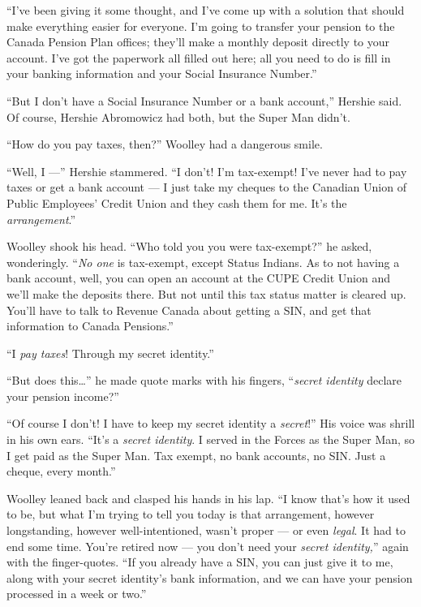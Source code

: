 ``I've been giving it some thought, and I've come up with a solution that 
should make everything easier for everyone. I'm going to transfer your pension 
to the Canada Pension Plan offices; they'll make a monthly deposit directly to 
your account. I've got the paperwork all filled out here; all you need to do is 
fill in your banking information and your Social Insurance Number.''

``But I don't have a Social Insurance Number or a bank account,''
Hershie said. Of course, Hershie Abromowicz had both, but the Super
Man didn't.

``How do you pay taxes, then?'' Woolley had a dangerous smile.

``Well, I ---'' Hershie stammered.
``I don't! I'm tax-exempt! I've never had to pay taxes or get a bank account 
--- I just take my cheques to the Canadian Union of Public Employees' Credit 
Union and they cash them for me. It's the \emph{arrangement}.''

Woolley shook his head. ``Who told you you were tax-exempt?'' he
asked, wonderingly.
``\emph{No one} is tax-exempt, except Status Indians. As to not having a bank 
account, well, you can open an account at the CUPE Credit Union and we'll make 
the deposits there. But not until this tax status matter is cleared up. You'll 
have to talk to Revenue Canada about getting a SIN, and get that information to 
Canada Pensions.''

``I \emph{pay taxes}! Through my secret identity.''

``But does this\ldots{}'' he made quote marks with his fingers,
``\emph{secret identity} declare your pension income?''

``Of course I don't! I have to keep my secret identity a \emph{secret}!''
His voice was shrill in his own ears.
``It's a \emph{secret identity}. I served in the Forces as the Super Man, so I 
get paid as the Super Man. Tax exempt, no bank accounts, no SIN. Just a cheque, 
every month.''

Woolley leaned back and clasped his hands in his lap.
``I know that's how it used to be, but what I'm trying to tell you today is 
that arrangement, however longstanding, however well-intentioned, wasn't proper 
--- or even \emph{legal}. It had to end some time. You're retired now --- you 
don't need your \emph{secret identity,}''
again with the finger-quotes.
``If you already have a SIN, you can just give it to me, along with your secret 
identity's bank information, and we can have your pension processed in a week 
or two.''

